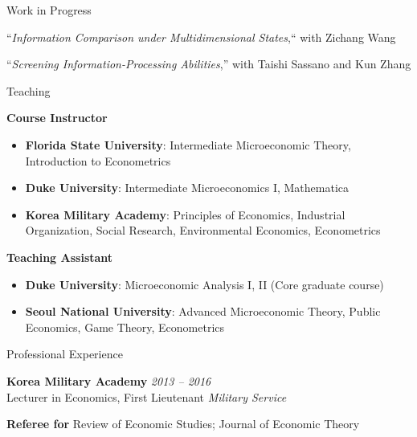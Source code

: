 \begin{rSection}{Work in Progress}
	\begin{etaremune}
		
		\item ``\textit{Information Comparison under Multidimensional States},`` with Zichang Wang
		
		\item 	``\textit{Screening Information-Processing Abilities},'' with Taishi Sassano and Kun Zhang
		
	\end{etaremune}
\end{rSection}




\medskip

\begin{rSection}{Teaching}
	
	
	\textbf{Course Instructor}	
	\begin{itemize}
		\item[] \textbf{Florida State University}: Intermediate Microeconomic Theory, Introduction to Econometrics
		\item[] \textbf{Duke University}: Intermediate Microeconomics I, Mathematica 
		\item[] \textbf{Korea Military Academy}: Principles of Economics, Industrial Organization, Social Research, Environmental Economics, Econometrics 
	\end{itemize}
	
	\textbf{Teaching Assistant}
	\begin{itemize}
		\item[] \textbf{Duke University}: Microeconomic Analysis I, II (Core graduate course) 
		\item[] \textbf{Seoul National University}: Advanced Microeconomic Theory, Public Economics, Game Theory, Econometrics
	\end{itemize}
	
	
\end{rSection}
\medskip


\begin{rSection}{Professional Experience}
	
	{\bf Korea Military Academy} \hfill {\em 2013 -- 2016} \\[5pt] 
	Lecturer in Economics, First Lieutenant \hfill {\em Military Service}
	
	\medskip 
	
	{\bf Referee for } Review of Economic Studies; Journal of Economic Theory
	
\end{rSection}
\medskip


